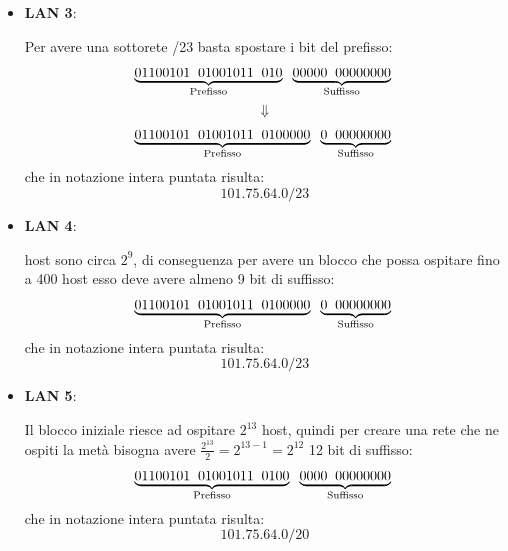 \documentclass[a4paper]{article}
\begin{document}
\begin{enumerate}
\begin{itemize}
  \item \textbf{LAN 3}:

    \vspace{1em}
    \noindent
    Per avere una sottorete /23 basta spostare i bit del prefisso:
    \[
      \underbrace{01100101 \;\; 01001011 \;\; 010}_{\text{Prefisso}}
      \;\; \underbrace{00000 \;\; 00000000}_{\text{Suffisso}}\\
    \]
    \[
      \Downarrow
    \]
    \[
      \underbrace{01100101 \;\; 01001011 \;\; 0100000}_{\text{Prefisso}}
      \;\; \underbrace{0 \;\; 00000000}_{\text{Suffisso}}\\
    \] 
    che in notazione intera puntata risulta:
    \[
      101.75.64.0/23
    \] 


  \item \textbf{LAN 4}:

    \vspace{1em}
     host sono circa \( 2^{9} \), di conseguenza per avere un blocco che possa
    ospitare fino a 400 host esso deve avere almeno 9 bit di suffisso:
    \[
      \underbrace{01100101 \;\; 01001011 \;\; 0100000}_{\text{Prefisso}}
      \;\; \underbrace{0 \;\; 00000000}_{\text{Suffisso}}\\
    \] 
    che in notazione intera puntata risulta:
    \[
      101.75.64.0/23
    \] 

  \item \textbf{LAN 5}:

    \vspace{1em}
    \noindent
    Il blocco iniziale riesce ad ospitare \( 2^{13} \) host, quindi per creare una rete
    che ne ospiti la metà bisogna avere \( \frac{2^{13}}{2} = 2^{13-1} = 2^{12} \) 12
    bit di suffisso:
    \[
      \underbrace{01100101 \;\; 01001011 \;\; 0100}_{\text{Prefisso}}
      \;\; \underbrace{0000 \;\; 00000000}_{\text{Suffisso}}\\
    \] 
    che in notazione intera puntata risulta:
    \[
      101.75.64.0/20
    \] 
\end{itemize}
\end{enumerate}
\end{document}
